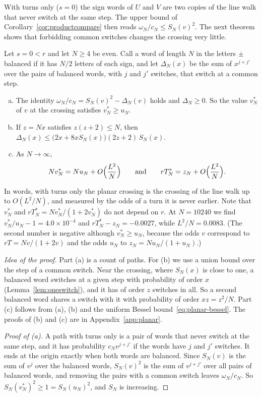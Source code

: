 With turns only ($s=0$) the sign words of $U$ and $V$ are two copies of the line walk
that never switch at the same step. The upper bound of Corollary~\ref{cor:productcompare} then
reads $\omega_N/c_N\le S_N(v)^2$. The next theorem shows that forbidding common switches changes the
crossing very little.

\begin{theorem}\label{thm:pureturns}
Let $s=0<r$ and let $N\ge4$ be even. Call a word of length $N$ in the letters $\pm$ balanced if it
has $N/2$ letters of each sign, and let $\Delta_N(x)$ be the sum of $x^{j+j'}$ over the pairs of
balanced words, with $j$ and $j'$ switches, that switch at a common step.
\begin{enumerate}[(a)]
\item The identity $\omega_N/c_N=S_N(v)^2-\Delta_N(v)$ holds and $\Delta_N\ge0$. So the value $v^*_N$ of $v$ at the
crossing satisfies $v^*_N\ge u_N$.
\item If $z=Nx$ satisfies $z(z+2)\le N$, then
$\Delta_N(x)\le\bigl(2x+8xS_N(x)\bigr)(2z+2)\,S_N(x)$.
\item As $N\to\infty$,
\[
 Nv^*_N=Nu_N+O\Bigl(\frac{L^2}N\Bigr)\qquad\text{and}\qquad
 rT^*_N=z_N+O\Bigl(\frac{L^2}N\Bigr).
\]
\end{enumerate}
\end{theorem}

In words, with turns only the planar crossing is the crossing of the line walk up to $O(L^2/N)$,
and measured by
the odds of a turn it is never earlier. Note that $v^*_N$ and $rT^*_N=Nv^*_N/(1+2v^*_N)$ do not
depend on $r$. At $N=10240$ we find $v^*_N/u_N-1=4.0\times10^{-4}$ and $rT^*_N-z_N=-0.0027$, while
$L^2/N=0.0083$. (The second number is negative although $v^*_N\ge u_N$, because the odds $v$
correspond to $rT=Nv/(1+2v)$ and the odds $u_N$ to $z_N=Nu_N/(1+u_N)$.)

\emph{Idea of the proof.} Part (a) is a count of paths. For (b) we use a union bound over the step
of a common switch. Near the crossing, where $S_N(x)$ is close to one, a balanced word switches
at a given step with probability of order $x$ (Lemma~\ref{lem:oneswitch}), and it has of order
$z$ switches in all. So a second balanced
word shares a switch with it with probability of order $xz=z^2/N$. Part (c) follows from (a), (b)
and the uniform Bessel bound~\eqref{eq:planar-bessel}. The proofs of (b) and (c) are in
Appendix~\ref{app:planar}.

\begin{proof}[Proof of (a)]
A path with turns only is a pair of words that never switch at the same step, and it has
probability $c_Nv^{j+j'}$ if the words have $j$ and $j'$ switches. It ends at the origin exactly
when both words are balanced. Since $S_N(v)$ is the sum of $v^j$ over the balanced words,
$S_N(v)^2$ is the sum of $v^{j+j'}$ over all pairs of balanced words, and removing the pairs with a
common switch leaves $\omega_N/c_N$. So $S_N(v^*_N)^2\ge1=S_N(u_N)^2$, and $S_N$ is increasing.
\end{proof}
